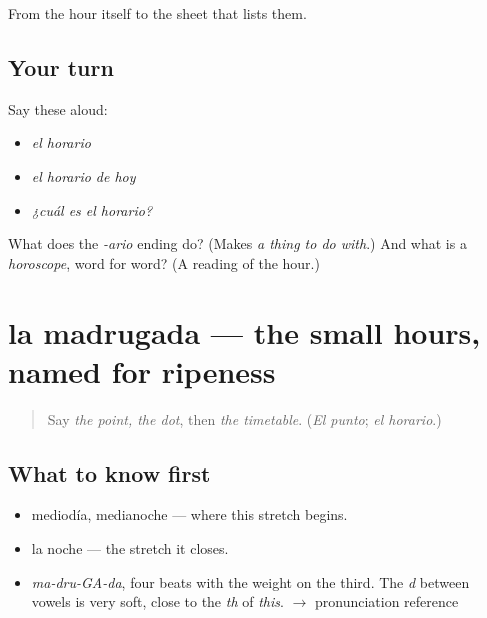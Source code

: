 \begin{grammarlens}[title={What you've built}]
From the hour itself to the sheet that lists them.
\end{grammarlens}

\subsection*{Your turn}
Say these aloud:

\begin{itemize}
\raggedright
  \item \emph{el horario}
  \item \emph{el horario de hoy}
  \item \emph{¿cuál es el horario?}
\end{itemize}

\begin{tcolorbox}[breakable,colback=teal!4,colframe=teal!35!black,title={Before you move on}]
What does the \emph{-ario} ending do? (Makes \emph{a thing to do with}.) And what is a \emph{horoscope}, word for word? (A reading of the hour.)
\end{tcolorbox}
\section[la madrugada]{la madrugada — the small hours, named for ripeness}

\label{lesson:ES-C342-madrugada}



\begin{quote}
Say \emph{the point, the dot}, then \emph{the timetable}. (\emph{El punto}; \emph{el horario}.)
\end{quote}

\subsection*{What to know first}
\begin{itemize}
\raggedright
  \item mediodía, medianoche — where this stretch begins.
  \item la noche — the stretch it closes.
\end{itemize}

\begin{sounds}
\begin{itemize}
\raggedright
  \item \emph{ma-dru-GA-da}, four beats with the weight on the third. The \emph{d} between vowels is very soft, close to the \emph{th} of \emph{this}. $\to$ pronunciation reference
\end{itemize}
\end{sounds}

